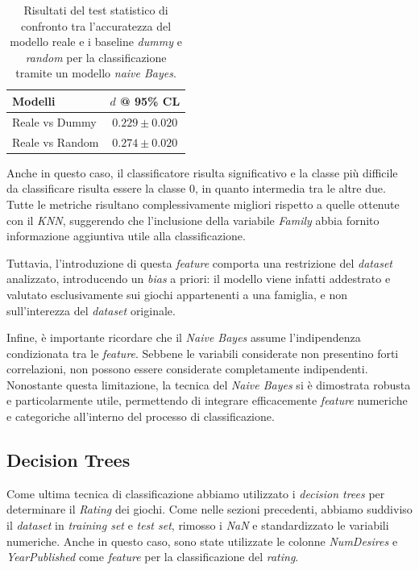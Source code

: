 \documentclass[10pt,twocolumn]{article}
\begin{document}
\begin{table}[ht]
\centering
\begin{tabular}{|l|c|}
    \hline
    \textbf{Modelli} & $d$ \textbf{ @ 95\% CL} \\
    \hline
    Reale vs Dummy & $0.229 \pm 0.020$ \\
    Reale vs Random & $0.274 \pm 0.020$ \\
    \hline
\end{tabular}
\caption{Risultati del test statistico di confronto tra l’accuratezza del modello reale e i baseline \textit{dummy} e \textit{random} per la classificazione tramite un modello \textit{naive Bayes}.}
\label{tab:real_dummy_random_table_NB}
\end{table}

Anche in questo caso, il classificatore risulta significativo e la classe più difficile da classificare risulta essere la classe $0$, in quanto intermedia tra le altre due. Tutte le metriche risultano complessivamente migliori rispetto a quelle ottenute con il \textit{KNN}, suggerendo che l’inclusione della variabile \textit{Family} abbia fornito informazione aggiuntiva utile alla classificazione.

Tuttavia, l’introduzione di questa \textit{feature} comporta una restrizione del \textit{dataset} analizzato, introducendo un \textit{bias} a priori: il modello viene infatti addestrato e valutato esclusivamente sui giochi appartenenti a una famiglia, e non sull’interezza del \textit{dataset} originale.

Infine, è importante ricordare che il \textit{Naive Bayes} assume l’indipendenza condizionata tra le \textit{feature}. Sebbene le variabili considerate non presentino forti correlazioni, non possono essere considerate completamente indipendenti. Nonostante questa limitazione, la tecnica del \textit{Naive Bayes} si è dimostrata robusta e particolarmente utile, permettendo di integrare efficacemente \textit{feature} numeriche e categoriche all’interno del processo di classificazione.


\subsection{Decision Trees}

Come ultima tecnica di classificazione abbiamo utilizzato i \textit{decision trees} per determinare il \textit{Rating} dei giochi. Come nelle sezioni precedenti, abbiamo suddiviso il \textit{dataset} in \textit{training set} e \textit{test set}, rimosso i \textit{NaN} e standardizzato le variabili numeriche. Anche in questo caso, sono state utilizzate le colonne \textit{NumDesires} e \textit{YearPublished} come \textit{feature} per la classificazione del \textit{rating}.
\end{document}
